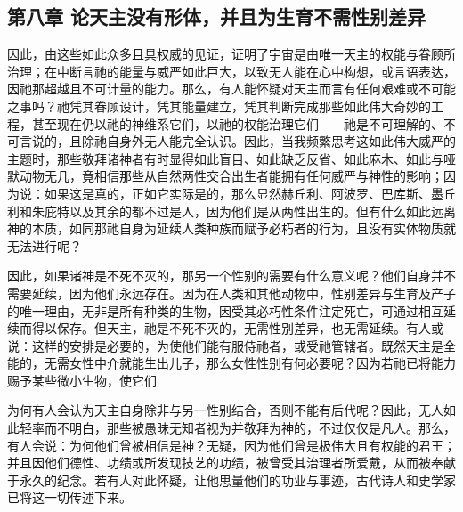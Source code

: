 
\subsection{第八章  论天主没有形体，并且为生育不需性别差异}

因此，由这些如此众多且具权威的见证，证明了宇宙是由唯一天主的权能与眷顾所治理；在中断言祂的能量与威严如此巨大，以致无人能在心中构想，或言语表达，因祂那超越且不可计量的能力。那么，有人能怀疑对天主而言有任何艰难或不可能之事吗？祂凭其眷顾设计，凭其能量建立，凭其判断完成那些如此伟大奇妙的工程，甚至现在仍以祂的神维系它们，以祂的权能治理它们——祂是不可理解的、不可言说的，且除祂自身外无人能完全认识。因此，当我频繁思考这如此伟大威严的主题时，那些敬拜诸神者有时显得如此盲目、如此缺乏反省、如此麻木、如此与哑默动物无几，竟相信那些从自然两性交合出生者能拥有任何威严与神性的影响；因为说：如果这是真的，正如它实际是的，那么显然赫丘利、阿波罗、巴库斯、墨丘利和朱庇特以及其余的都不过是人，因为他们是从两性出生的。但有什么如此远离神的本质，如同那祂自身为延续人类种族而赋予必朽者的行为，且没有实体物质就无法进行呢？\par

因此，如果诸神是不死不灭的，那另一个性别的需要有什么意义呢？他们自身并不需要延续，因为他们永远存在。因为在人类和其他动物中，性别差异与生育及产子的唯一理由，无非是所有种类的生物，因受其必朽性条件注定死亡，可通过相互延续而得以保存。但天主，祂是不死不灭的，无需性别差异，也无需延续。有人或说：这样的安排是必要的，为使他们能有服侍祂者，或受祂管辖者。既然天主是全能的，无需女性中介就能生出儿子，那么女性性别有何必要呢？因为若祂已将能力赐予某些微小生物，使它们\par

\par

为何有人会认为天主自身除非与另一性别结合，否则不能有后代呢？因此，无人如此轻率而不明白，那些被愚昧无知者视为并敬拜为神的，不过仅仅是凡人。那么，有人会说：为何他们曾被相信是神？无疑，因为他们曾是极伟大且有权能的君王；并且因他们德性、功绩或所发现技艺的功绩，被曾受其治理者所爱戴，从而被奉献于永久的纪念。若有人对此怀疑，让他思量他们的功业与事迹，古代诗人和史学家已将这一切传述下来。\par


